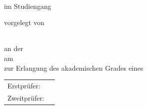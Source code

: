 \begin{titlepage}
  \centering


  \vspace{20mm}
  {\huge{\getDoctype{}}}\\

  {\large im Studiengang \getCourseOfStudies{}}

  \vspace{10mm}
  {\huge\bfseries \getTitle{} \par}

  \vspace*{10mm}
  vorgelegt von 

  {\large \getAuthor{}} \\
  an der \getUniversity{} \\
  am \getSubmissionDate{} \\

  \vspace{5mm}
  zur Erlangung des akademischen Grades eines \\
  \getAcademicDegree{}

  \vspace{15mm}
  \begin{tabular}{l l}
    Erstprüfer:      & \getSupervisor{} \\
    Zweitprüfer:     & \getAdvisor{} \\
  \end{tabular}

\end{titlepage}
